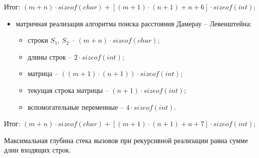 Итог: $(m + n) \cdot sizeof(char) + [(m + 1) \cdot (n + 1) + n + 6] \cdot sizeof(int)$;

\begin{itemize}
	\item матричная реализация алгоритма поиска расстояния Дамерау -- Левенштейна:\begin{itemize}
		\item строки $S_{1}$, $S_{2}$ -- $(m + n) \cdot sizeof(char)$;
		\item длины строк -- $2 \cdot sizeof(int)$;
		\item матрица -- $((m + 1) \cdot (n + 1)) \cdot sizeof(int)$;
		\item текущая строка матрицы -- $(n + 1) \cdot sizeof(int)$;
		\item вспомогательные переменные --  $4 \cdot  sizeof(int)$.
	\end{itemize}
\end{itemize}

Итог: $(m + n) \cdot sizeof(char) + [(m + 1) \cdot (n + 1) + n + 7] \cdot sizeof(int)$;

Максимальная глубина стека вызовов при рекурсивной реализации равна сумме длин входящих строк.

